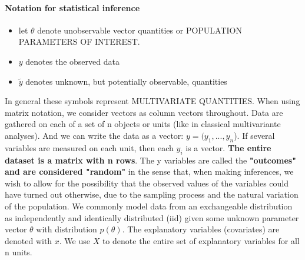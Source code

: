 \documentclass {article}
\begin{document}
\paragraph{Notation for statistical inference}

\begin{itemize}
\item let $\theta$ denote unobservable vector quantities or POPULATION PARAMETERS OF INTEREST. 
\item $y$ denotes the observed data 
\item $\tilde{y}$ denotes unknown, but potentially observable, quantities 
\end{itemize}
In general these symbols represent MULTIVARIATE QUANTITIES. 
When using matrix notation, we consider vectors as column vectors throughout. 
Data are gathered on each of a set of n objects or units (like in classical multivariante analyses).
 And we can write the data as a vector: $y=(y_1, ..., y_n$).
 If several variables are measured on each unit, then each $y_i$ is a vector. 
\textbf{The entire dataset is a matrix with n rows}. The y variables are called the \textbf{"outcomes" and are considered "random"} in the sense that, when making inferences, we wish to allow for the possibility that the observed values of the variables could have turned out otherwise, due to the sampling process and the natural variation of the population.
We commonly model data from an exchangeable distribution as independently and identically distributed (iid) given some unknown parameter vector $\theta$ with distribution $p(\theta)$. 
The explanatory variables (covariates) are denoted with $x$.   
We use $X$ to denote the entire set of explanatory variables for all n units. 
\end{document}
